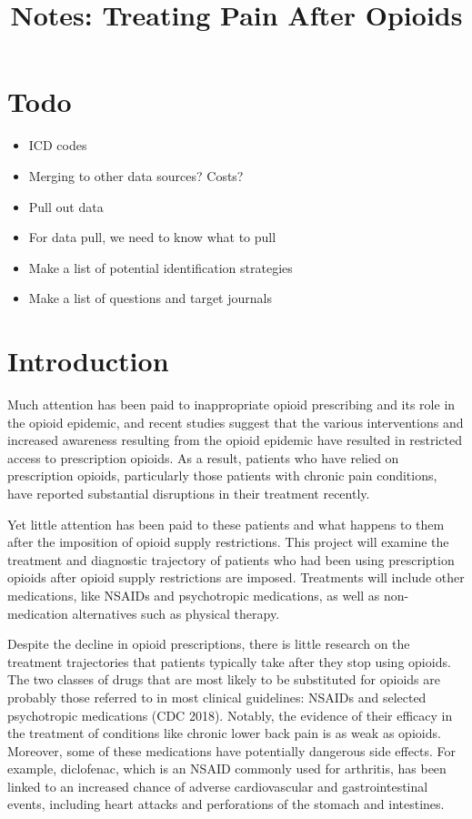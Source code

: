 \documentclass[10pt]{article}
\begin{document}
\title{Notes: Treating Pain After Opioids}
\maketitle
\section{Todo}

\begin{itemize}
\item ICD codes
\item Merging to other data sources? Costs?
\item Pull out data
\item For data pull, we need to know what to pull
\item Make a list of potential identification strategies
\item Make a list of questions and target journals
\end{itemize}

\section{Introduction}
Much attention has been paid to inappropriate opioid prescribing and its role in the opioid epidemic, and recent studies suggest that the various interventions and increased awareness resulting from the opioid epidemic have resulted in restricted access to prescription opioids. As a result, patients who have relied on prescription opioids, particularly those patients with chronic pain conditions, have reported substantial disruptions in their treatment recently. 

Yet little attention has been paid to these patients and what happens to them after the imposition of opioid supply restrictions. This project will examine the treatment and diagnostic trajectory of patients who had been using prescription opioids after opioid supply restrictions are imposed. Treatments will include other medications, like NSAIDs and psychotropic medications, as well as non-medication alternatives such as physical therapy.

Despite the decline in opioid prescriptions, there is little research on the treatment trajectories that patients typically take after they stop using opioids. The two classes of drugs that are most likely to be substituted for opioids are probably those referred to in most clinical guidelines: NSAIDs and selected psychotropic medications (CDC 2018). Notably, the evidence of their efficacy in the treatment of conditions like chronic lower back pain is as weak as opioids. Moreover, some of these medications have potentially dangerous side effects. For example, diclofenac, which is an NSAID commonly used for arthritis, has been linked to an increased chance of adverse cardiovascular and gastrointestinal events, including heart attacks and perforations of the stomach and intestines.
\end{document}
